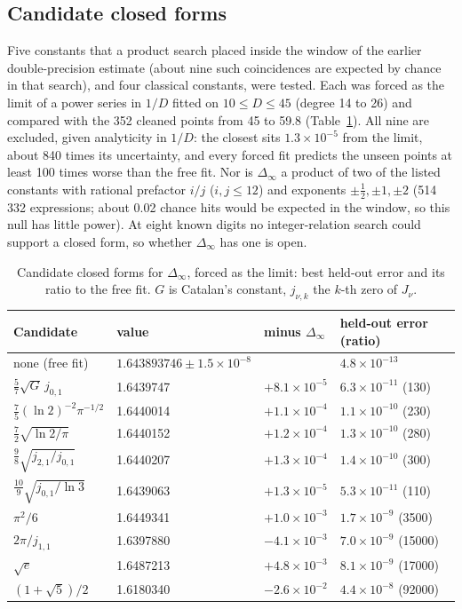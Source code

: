 \documentclass[aps,prd,onecolumn,superscriptaddress,nofootinbib,10pt]{revtex4-2}
\newcommand{\Dinf}{\Delta_\infty}
\begin{document}
\subsection{Candidate closed forms}

Five constants that a product search placed inside the window of the earlier double-precision estimate (about nine
such coincidences are expected by chance in that search), and four classical constants, were tested. Each was forced as
the limit of a power series in $1/D$ fitted on $10 \le D \le 45$ (degree 14 to 26) and compared with the 352 cleaned
points from 45 to 59.8 (Table~\ref{tab:cand}). All nine are excluded, given analyticity in $1/D$: the closest sits
$1.3\times10^{-5}$ from the limit, about 840 times its uncertainty, and every forced fit predicts the unseen points at
least 100 times worse than the free fit. Nor is $\Dinf$ a product of two of the listed constants with rational prefactor
$i/j$ ($i, j \le 12$) and exponents $\pm\tfrac12, \pm1, \pm2$ (514\,332 expressions; about 0.02 chance hits would be
expected in the window, so this null has little power). At eight known digits no integer-relation search could support
a closed form, so whether $\Dinf$ has one is open.

\begin{table}[htbp]
\caption{Candidate closed forms for $\Dinf$, forced as the limit: best held-out error and its ratio to the free fit.
$G$ is Catalan's constant, $j_{\nu,k}$ the $k$-th zero of $J_\nu$.}
\label{tab:cand}
\small
\begin{ruledtabular}
\begin{tabular}{llll}
Candidate & value & minus $\Dinf$ & held-out error (ratio) \\ \hline
none (free fit) & $1.643893746 \pm 1.5\times10^{-8}$ & & $4.8\times10^{-13}$ \\
$\tfrac57\sqrt{G}\,j_{0,1}$ & 1.6439747 & $+8.1\times10^{-5}$ & $6.3\times10^{-11}$ (130) \\
$\tfrac75(\ln2)^{-2}\pi^{-1/2}$ & 1.6440014 & $+1.1\times10^{-4}$ & $1.1\times10^{-10}$ (230) \\
$\tfrac72\sqrt{\ln2/\pi}$ & 1.6440152 & $+1.2\times10^{-4}$ & $1.3\times10^{-10}$ (280) \\
$\tfrac98\sqrt{j_{2,1}/j_{0,1}}$ & 1.6440207 & $+1.3\times10^{-4}$ & $1.4\times10^{-10}$ (300) \\
$\tfrac{10}{9}\sqrt{j_{0,1}/\ln3}$ & 1.6439063 & $+1.3\times10^{-5}$ & $5.3\times10^{-11}$ (110) \\
$\pi^2/6$ & 1.6449341 & $+1.0\times10^{-3}$ & $1.7\times10^{-9}$ (3500) \\
$2\pi/j_{1,1}$ & 1.6397880 & $-4.1\times10^{-3}$ & $7.0\times10^{-9}$ (15000) \\
$\sqrt e$ & 1.6487213 & $+4.8\times10^{-3}$ & $8.1\times10^{-9}$ (17000) \\
$(1+\sqrt5)/2$ & 1.6180340 & $-2.6\times10^{-2}$ & $4.4\times10^{-8}$ (92000) \\
\end{tabular}
\end{ruledtabular}
\end{table}
\end{document}
